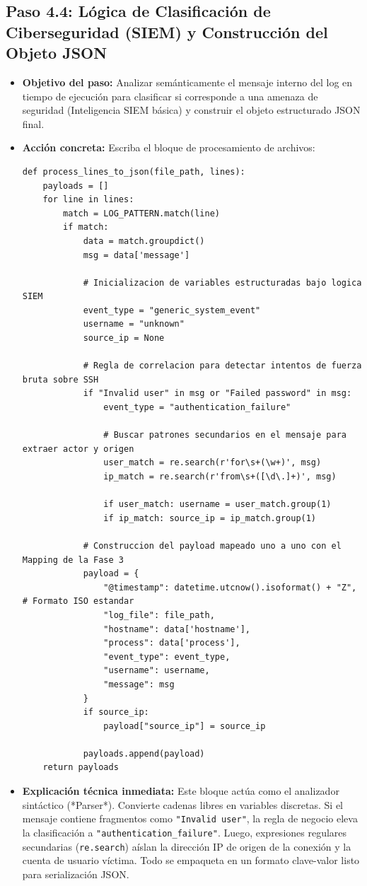 \documentclass[
  coursetitle={Cómputo Nube y Tecnologías Emergentes},
  coursehours={96},
  coursedate={Verano 2026},
  doctype={Práctica},
  otherlangs={english,french},
  authorname={Lázaro},
  authorsurname={Bustio-Martínez},
  authortitle={PhD},
  role={Profesor Investigador},
  email={lbustio@inaoe.mx},
  phone={5559504000},
  ext={7459},
  institution={Instituto Nacional de Astrofísica, Óptica y Electrónica (INAOE)},
  department={Maestría en Ciencias en Tecnologías de Seguridad},
  address={Luis Enrique Erro 1, Sta. Ma. Tonantzintla, San Andrés Cholula, CP 72840, Puebla, México},
  margin={0.5in}
]{../../lbustio_lecture_notes}
\begin{document}
\subsection{Paso 4.4: Lógica de Clasificación de Ciberseguridad (SIEM) y Construcción del Objeto JSON}
\begin{itemize}
    \item \textbf{Objetivo del paso:} Analizar semánticamente el mensaje interno del log en tiempo de ejecución para clasificar si corresponde a una amenaza de seguridad (Inteligencia SIEM básica) y construir el objeto estructurado JSON final.
    \item \textbf{Acción concreta:} Escriba el bloque de procesamiento de archivos:
\begin{verbatim}
def process_lines_to_json(file_path, lines):
    payloads = []
    for line in lines:
        match = LOG_PATTERN.match(line)
        if match:
            data = match.groupdict()
            msg = data['message']
            
            # Inicializacion de variables estructuradas bajo logica SIEM
            event_type = "generic_system_event"
            username = "unknown"
            source_ip = None
            
            # Regla de correlacion para detectar intentos de fuerza bruta sobre SSH
            if "Invalid user" in msg or "Failed password" in msg:
                event_type = "authentication_failure"
                
                # Buscar patrones secundarios en el mensaje para extraer actor y origen
                user_match = re.search(r'for\s+(\w+)', msg)
                ip_match = re.search(r'from\s+([\d\.]+)', msg)
                
                if user_match: username = user_match.group(1)
                if ip_match: source_ip = ip_match.group(1)
            
            # Construccion del payload mapeado uno a uno con el Mapping de la Fase 3
            payload = {
                "@timestamp": datetime.utcnow().isoformat() + "Z", # Formato ISO estandar
                "log_file": file_path,
                "hostname": data['hostname'],
                "process": data['process'],
                "event_type": event_type,
                "username": username,
                "message": msg
            }
            if source_ip:
                payload["source_ip"] = source_ip
            
            payloads.append(payload)
    return payloads
\end{verbatim}
    \item \textbf{Explicación técnica inmediata:} Este bloque actúa como el analizador sintáctico (*Parser*). Convierte cadenas libres en variables discretas. Si el mensaje contiene fragmentos como \texttt{"Invalid user"}, la regla de negocio eleva la clasificación a \texttt{"authentication\_failure"}. Luego, expresiones regulares secundarias (\texttt{re.search}) aíslan la dirección IP de origen de la conexión y la cuenta de usuario víctima. Todo se empaqueta en un formato clave-valor listo para serialización JSON.
\end{itemize}
\end{document}
